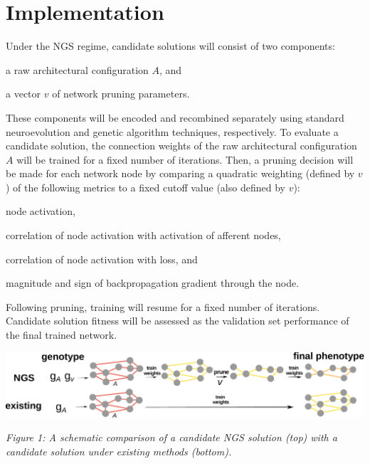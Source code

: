 \section{Implementation}

Under the NGS regime, candidate solutions will consist of two components:
\begin{enumerate*}[label=(\arabic*)]
\item a raw architectural configuration $A$, and
\item a vector $v$ of network pruning parameters.
\end{enumerate*}
These components will be encoded and recombined separately using standard neuroevolution and genetic algorithm techniques, respectively.
To evaluate a candidate solution, the connection weights of the raw architectural configuration $A$ will be trained for a fixed number of iterations.
Then, a pruning decision will be made for each network node by comparing a quadratic weighting (defined by $v$) of the following metrics to a fixed cutoff value (also defined by $v$):
\begin{enumerate*}[label=(\alph*)]
\item node activation,
\item correlation of node activation with activation of afferent nodes,
\item correlation of node activation with loss, and
\item magnitude and sign of backpropagation gradient through the node.
\end{enumerate*}
Following pruning, training will resume for a fixed number of iterations. Candidate solution fitness will be assessed as the validation set performance of the final trained network.
\begin{minipage}{0.8\textwidth}
 \includegraphics[width=\textwidth]{img/complete}
\end{minipage}%
\begin{minipage}{0.2\textwidth}
  {
  \begin{footnotesize}
    \textit{
   Figure 1: A schematic comparison of a candidate NGS solution (top) with a candidate solution under existing methods (bottom).
   }
  \end{footnotesize}
  \par}
\end{minipage}

